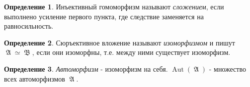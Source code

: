 \documentclass[a4paper,100pt]{article}
\theoremstyle{indented}
\theoremstyle{definition}
\newtheorem{defn}{Определение}
\theoremstyle{remark}
\DeclareMathOperator{\Aut}{Aut}
\DeclareMathOperator{\GA}{\mathfrak{A}}
\DeclareMathOperator{\GB}{\mathfrak{B}}
\begin{document}
\begin{defn}
  Инъективный гомоморфизм называют \textit{сложением}, если выполнено усиление первого пункта, где следствие заменяется на равносильность.
\end{defn}

\begin{defn}
  Сюръективное вложение называют \textit{изоморфизмом} и пишут $\GA \simeq \GB$, если они изоморфны, т.е. между ними существует изоморфизм.
\end{defn}

\begin{defn}
  \textit{Автоморфизм} - изоморфизм на себя. $\Aut(\GA)$ - множество всех автоморфизмов $\GA$. 
\end{defn}
\end{document}
